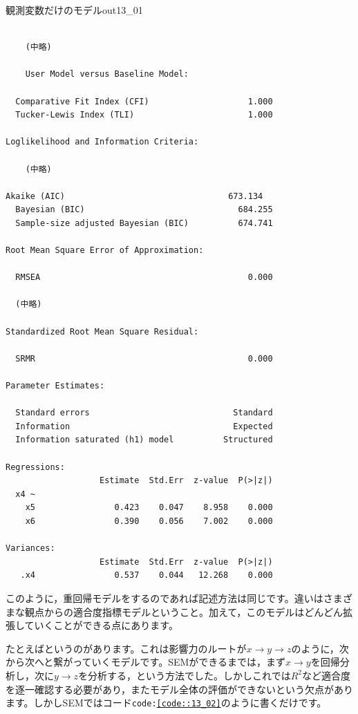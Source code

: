 \documentclass{ltjsbook}
\begin{document}
\begin{Rscreen}{観測変数だけのモデル}{out13_01}
\begin{verbatim}

    (中略)

    User Model versus Baseline Model:

  Comparative Fit Index (CFI)                    1.000
  Tucker-Lewis Index (TLI)                       1.000

Loglikelihood and Information Criteria:

    (中略)

Akaike (AIC)                                 673.134
  Bayesian (BIC)                               684.255
  Sample-size adjusted Bayesian (BIC)          674.741

Root Mean Square Error of Approximation:

  RMSEA                                          0.000

  (中略)

Standardized Root Mean Square Residual:

  SRMR                                           0.000

Parameter Estimates:

  Standard errors                             Standard
  Information                                 Expected
  Information saturated (h1) model          Structured

Regressions:
                   Estimate  Std.Err  z-value  P(>|z|)
  x4 ~                                                
    x5                0.423    0.047    8.958    0.000
    x6                0.390    0.056    7.002    0.000

Variances:
                   Estimate  Std.Err  z-value  P(>|z|)
   .x4                0.537    0.044   12.268    0.000
\end{verbatim}
\end{Rscreen}

このように，重回帰モデルをするのであれば記述方法は同じです。違いはさまざまな観点からの適合度指標モデルということ。加えて，このモデルはどんどん拡張していくことができる点にあります。

たとえばというのがあります。これは影響力のルートが$x \to y \to z$のように，次から次へと繋がっていくモデルです。SEMができるまでは，まず$x \to y$を回帰分析し，次に$y \to z$を分析する，という方法でした。しかしこれでは$R^2$など適合度を逐一確認する必要があり，またモデル全体の評価ができないという欠点があります。しかしSEMではコード\texttt{code:\ref{code::13_02}}のように書くだけです。
\end{document}
